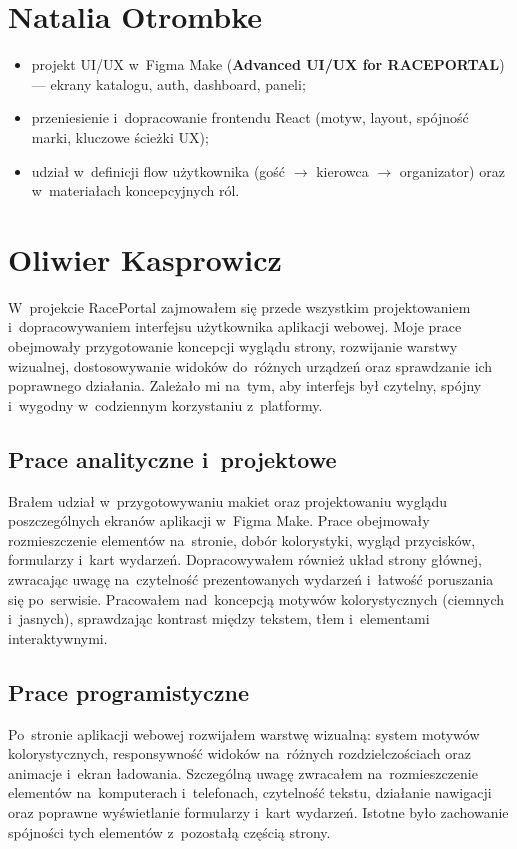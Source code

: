 \documentclass{sprz}
\begin{document}
\section{Natalia Otrombke}
\begin{itemize}
  \item projekt UI/UX w~Figma Make (\textbf{Advanced UI/UX for RACEPORTAL}) --- ekrany katalogu, auth, dashboard, paneli;
  \item przeniesienie i~dopracowanie frontendu React (motyw, layout, spójność marki, kluczowe ścieżki UX);
  \item udział w~definicji flow użytkownika (gość $\rightarrow$ kierowca $\rightarrow$ organizator) oraz w~materiałach koncepcyjnych ról.
\end{itemize}

\section{Oliwier Kasprowicz}
W~projekcie RacePortal zajmowałem się przede wszystkim projektowaniem i~dopracowywaniem interfejsu użytkownika aplikacji webowej. Moje prace obejmowały przygotowanie koncepcji wyglądu strony, rozwijanie warstwy wizualnej, dostosowywanie widoków do~różnych urządzeń oraz sprawdzanie ich poprawnego działania. Zależało mi na~tym, aby interfejs był czytelny, spójny i~wygodny w~codziennym korzystaniu z~platformy.

\subsection{Prace analityczne i~projektowe}
Brałem udział w~przygotowywaniu makiet oraz projektowaniu wyglądu poszczególnych ekranów aplikacji w~Figma Make. Prace obejmowały rozmieszczenie elementów na~stronie, dobór kolorystyki, wygląd przycisków, formularzy i~kart wydarzeń. Dopracowywałem również układ strony głównej, zwracając uwagę na~czytelność prezentowanych wydarzeń i~łatwość poruszania się po~serwisie. Pracowałem nad~koncepcją motywów kolorystycznych (ciemnych i~jasnych), sprawdzając kontrast między tekstem, tłem i~elementami interaktywnymi.

\subsection{Prace programistyczne}
Po~stronie aplikacji webowej rozwijałem warstwę wizualną: system motywów kolorystycznych, responsywność widoków na~różnych rozdzielczościach oraz animacje i~ekran ładowania. Szczególną uwagę zwracałem na~rozmieszczenie elementów na~komputerach i~telefonach, czytelność tekstu, działanie nawigacji oraz poprawne wyświetlanie formularzy i~kart wydarzeń. Istotne było zachowanie spójności tych elementów z~pozostałą częścią strony.
\end{document}
